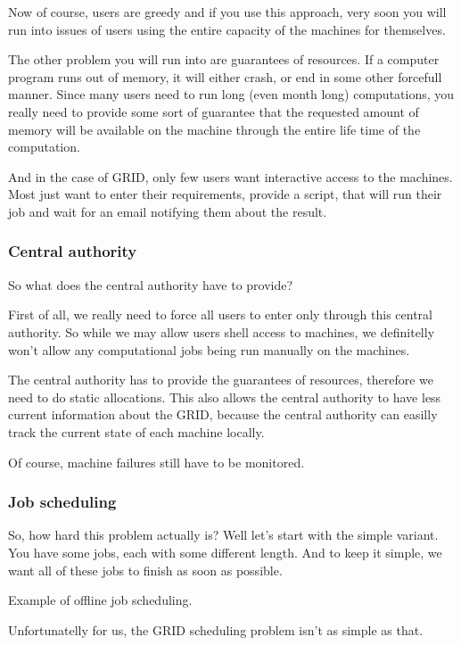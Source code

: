 \documentclass[10pt]{article}
\begin{document}
Now of course, users are greedy and if you use this approach, very soon you
will run into issues of users using the entire capacity of the machines for
themselves.

The other problem you will run into are guarantees of resources. If a computer
program runs out of memory, it will either crash, or end in some other
forcefull manner. Since many users need to run long (even month long)
computations, you really need to provide some sort of guarantee that the
requested amount of memory will be available on the machine through the entire
life time of the computation.

And in the case of GRID, only few users want interactive access to the
machines. Most just want to enter their requirements, provide a script, that
will run their job and wait for an email notifying them about the result.

\subsubsection{Central authority}

So what does the central authority have to provide?

First of all, we really need to force all users to enter only through this
central authority. So while we may allow users shell access to machines, we
definitelly won't allow any computational jobs being run manually on the machines.

The central authority has to provide the guarantees of resources, therefore we
need to do static allocations. This also allows the central authority to have
less current information about the GRID, because the central authority can
easilly track the current state of each machine locally.

Of course, machine failures still have to be monitored.

\subsubsection{Job scheduling}

So, how hard this problem actually is? Well let's start with the simple variant.
You have some jobs, each with some different length.  And to keep it simple, we
want all of these jobs to finish as soon as possible.  

Example of offline job scheduling.

Unfortunatelly for us, the GRID scheduling problem isn't as simple as that.
\end{document}
